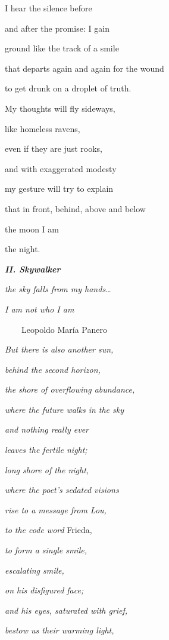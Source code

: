 I hear the silence before

and after the promise: I gain 

ground like the track of a smile

that departs again and again for the wound

to get drunk on a droplet of truth.


\bigskip

My thoughts will fly sideways, 

like homeless ravens,

even if they are just rooks,

and with exaggerated modesty

my gesture will try to explain

that in front, behind, above and below

the moon I am

the night.


\bigskip


\bigskip

{\bfseries\itshape
II. Skywalker}


\bigskip

\emph{
the sky falls from my hands…}

\emph{
I am not who I am}

\ \ \ \  Leopoldo María Panero


\bigskip


\bigskip

\emph{
But there is also another sun,}

\emph{
behind the second horizon,}

\emph{
the shore of overflowing abundance, }

\emph{
where the future walks in the sky}

\emph{
and nothing really ever}

\emph{
leaves the fertile night;}

\emph{
long shore of the night,}

\emph{
where the poet's sedated visions }

\emph{
rise to a message from Lou,}

\emph{to the code word }Frieda, 

\emph{
to form a single smile,}

\emph{
escalating smile,}

\emph{
on his disfigured face;}

\emph{
and his eyes, saturated with grief,}

\emph{
bestow us their warming light,}

